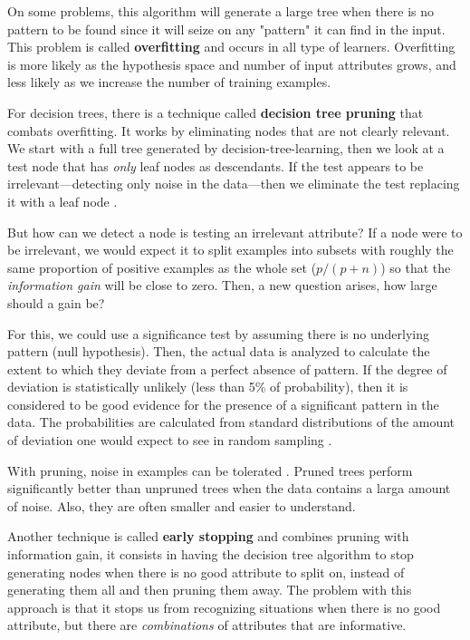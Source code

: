 \documentclass[10pt]{article}
\begin{document}
On some problems, this algorithm will generate a large tree when there is no pattern to be found since it will seize on any "pattern" it can find in the input. This problem is called \textbf{overfitting} and occurs in all type of learners. Overfitting is more likely as the hypothesis space and number of input attributes grows, and less likely as we increase the number of training examples. \par
For decision trees, there is a technique called \textbf{decision tree pruning} that combats overfitting. It works by eliminating nodes that are not clearly relevant. We start with a full tree generated by decision-tree-learning, then we look at a test node that has \textit{only} leaf nodes as descendants. If the test appears to be irrelevant---detecting only noise in the data---then we eliminate the test replacing it with a leaf node \cite{ai}. \par
But how can we detect a node is testing an irrelevant attribute? If a node were to be irrelevant, we would expect it to split examples into subsets with roughly the same proportion of positive examples as the whole set ($p/(p+n)$) so that the \textit{information gain} will be close to zero. Then, a new question arises, how large should a gain be? \par
For this, we could use a significance test by assuming there is no underlying pattern (null hypothesis). Then, the actual data is analyzed to calculate the extent to which they deviate from a perfect absence of pattern. If the degree of deviation is statistically unlikely (less than 5\% of probability), then it is considered to be good evidence for the presence of a significant pattern in the data. The probabilities are calculated from standard distributions of the amount of deviation one would expect to see in random sampling \cite{ai}. \par
With pruning, noise in examples can be tolerated \cite{ai}. Pruned trees perform significantly better than unpruned trees when the data contains a larga amount of noise. Also, they are often smaller and easier to understand. \par
Another technique is called \textbf{early stopping} and combines pruning with information gain, it consists in having the decision tree algorithm to stop generating nodes when there is no good attribute to split on, instead of generating them all and then pruning them away. The problem with this approach is that it stops us from recognizing situations when there is no good attribute, but there are \textit{combinations} of attributes that are informative. \par
\end{document}
